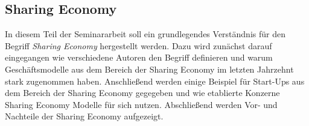 \documentclass[a4paper]{scrartcl}
\begin{document}
\begin{multicols}{2}
		
	\section{Sharing Economy}
		In diesem Teil der Seminararbeit soll ein grundlegendes Verst\"andnis f\"ur den Begriff \textit{Sharing Economy} hergestellt werden. Dazu wird zun\"achst darauf eingegangen wie verschiedene Autoren den Begriff definieren und warum Gesch\"aftsmodelle aus dem Bereich der Sharing Economy im letzten Jahrzehnt stark zugenommen haben. Anschlie\ss end werden einige Beispiel f\"ur Start-Ups aus dem Bereich der Sharing Economy gegegeben und wie etablierte Konzerne Sharing Economy Modelle f\"ur sich nutzen. Abschlie\ss end werden Vor- und Nachteile der Sharing Economy aufgezeigt.
	

\end{multicols}
\end{document}

